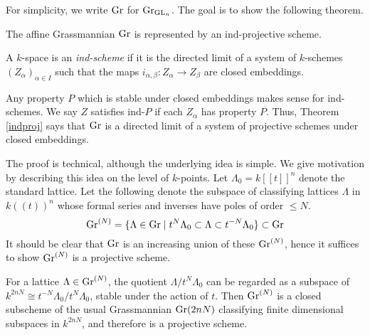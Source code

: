 \documentclass[12pt]{article}
\begin{document}
For simplicity, we write $\operatorname{Gr}$ for $\operatorname{Gr}_{\operatorname{GL}_n}$. The goal is to show the following theorem.
\begin{thm}\label{indproj}
    The affine Grassmannian $\operatorname{Gr}$ is represented by an ind-projective scheme.
\end{thm}
\begin{defn}
    A $k$-space is an \textit{ind-scheme} if it is the directed limit of a system of $k$-schemes $(Z_{\alpha})_{\alpha \in I}$ such that the maps $i_{\alpha, \beta} \colon Z_{\alpha} \to Z_{\beta}$ are closed embeddings.
\end{defn}
Any property $P$ which is stable under closed embeddings makes sense for ind-schemes. We say $Z$ satisfies ind-$P$ if each $Z_{\alpha}$ has property $P$. Thus, Theorem \ref{indproj} says that $\operatorname{Gr}$ is a directed limit of a system of projective schemes under closed embeddings.

The proof is technical, although the underlying idea is simple. We give motivation by describing this idea on the level of $k$-points. Let $\Lambda_0 = k[[t]]^n$ denote the standard lattice. Let the following denote the subspace of classifying lattices $\Lambda$ in $k((t))^n$ whose formal series and inverses have poles of order $\leq N$.
\[\operatorname{Gr}^{(N)} = \{\Lambda \in \operatorname{Gr} \mid t^{N}  \Lambda_0 \subset \Lambda \subset t^{-N} \Lambda_0\} \subset \operatorname{Gr}\]
It should be clear that $\operatorname{Gr} $ is an increasing union of these $\operatorname{Gr}^{(N)}$, hence it suffices to show $\operatorname{Gr}^{(N)}$ is a projective scheme.

For a lattice $\Lambda \in \operatorname{Gr}^{(N)}$, the quotient $\Lambda/t^N \Lambda_0$ can be regarded as a subspace of $k^{2nN} \cong t^{-N} \Lambda_0/t^N \Lambda_0$, stable under the action of $t$. Then $\operatorname{Gr}^{(N)}$ is a closed subscheme of the usual Grassmannian $\operatorname{Gr}(2nN)$ classifying finite dimensional subspaces in $k^{2nN}$, and therefore is a projective scheme.
\end{document}
